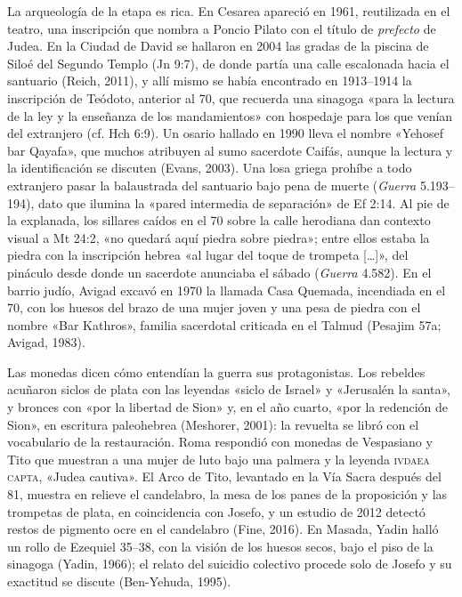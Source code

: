 La arqueología de la etapa es rica. En Cesarea apareció en 1961, reutilizada en el teatro, una inscripción que nombra a Poncio Pilato con el título de \emph{prefecto} de Judea. En la Ciudad de David se hallaron en 2004 las gradas de la piscina de Siloé del Segundo Templo (Jn 9:7), de donde partía una calle escalonada hacia el santuario (Reich, 2011), y allí mismo se había encontrado en 1913--1914 la inscripción de Teódoto, anterior al 70, que recuerda una sinagoga «para la lectura de la ley y la enseñanza de los mandamientos» con hospedaje para los que venían del extranjero (cf. Hch 6:9). Un osario hallado en 1990 lleva el nombre «Yehosef bar Qayafa», que muchos atribuyen al sumo sacerdote Caifás, aunque la lectura y la identificación se discuten (Evans, 2003). Una losa griega prohíbe a todo extranjero pasar la balaustrada del santuario bajo pena de muerte (\emph{Guerra} 5.193--194), dato que ilumina la «pared intermedia de separación» de Ef 2:14. Al pie de la explanada, los sillares caídos en el 70 sobre la calle herodiana dan contexto visual a Mt 24:2, «no quedará aquí piedra sobre piedra»; entre ellos estaba la piedra con la inscripción hebrea «al lugar del toque de trompeta [\ldots]», del pináculo desde donde un sacerdote anunciaba el sábado (\emph{Guerra} 4.582). En el barrio judío, Avigad excavó en 1970 la llamada Casa Quemada, incendiada en el 70, con los huesos del brazo de una mujer joven y una pesa de piedra con el nombre «Bar Kathros», familia sacerdotal criticada en el Talmud (Pesajim 57a; Avigad, 1983).

Las monedas dicen cómo entendían la guerra sus protagonistas. Los rebeldes acuñaron siclos de plata con las leyendas «siclo de Israel» y «Jerusalén la santa», y bronces con «por la libertad de Sion» y, en el año cuarto, «por la redención de Sion», en escritura paleohebrea (Meshorer, 2001): la revuelta se libró con el vocabulario de la restauración. Roma respondió con monedas de Vespasiano y Tito que muestran a una mujer de luto bajo una palmera y la leyenda \textsc{ivdaea capta}, «Judea cautiva». El Arco de Tito, levantado en la Vía Sacra después del 81, muestra en relieve el candelabro, la mesa de los panes de la proposición y las trompetas de plata, en coincidencia con Josefo, y un estudio de 2012 detectó restos de pigmento ocre en el candelabro (Fine, 2016). En Masada, Yadin halló un rollo de Ezequiel 35--38, con la visión de los huesos secos, bajo el piso de la sinagoga (Yadin, 1966); el relato del suicidio colectivo procede solo de Josefo y su exactitud se discute (Ben-Yehuda, 1995).

